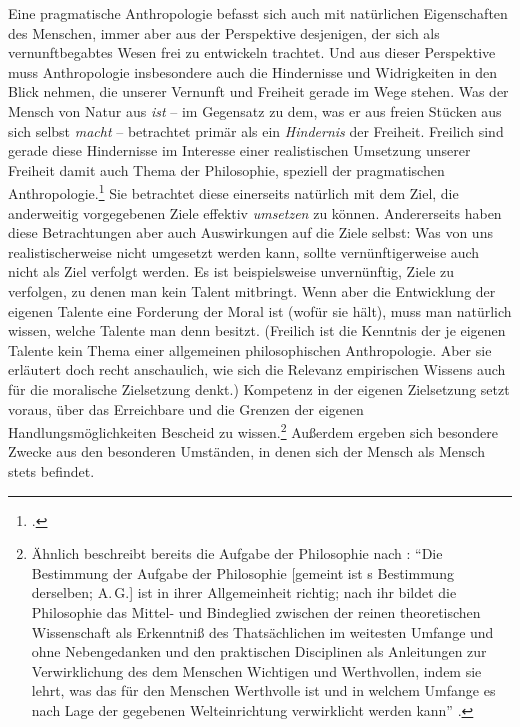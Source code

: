 Eine pragmatische Anthropologie befasst sich auch mit natürlichen Eigenschaften
des Menschen, immer aber aus der Perspektive desjenigen, der sich als
vernunftbegabtes Wesen frei zu entwickeln trachtet. Und aus dieser Perspektive
muss Anthropologie insbesondere auch die Hindernisse und
Widrigkeiten in den Blick nehmen, die unserer Vernunft und
Freiheit gerade im Wege stehen. Was der Mensch von Natur aus \emph{ist} -- im
Gegensatz zu dem, was er aus freien Stücken aus sich selbst \emph{macht} --
betrachtet  primär als ein \emph{Hindernis} der Freiheit.
Freilich sind gerade diese
Hindernisse im Interesse einer realistischen Umsetzung unserer Freiheit damit
auch Thema der Philosophie, speziell der pragmatischen
Anthropologie.\footcite[Vgl.][68]{Cohen:KantandtheHumanSciences2009} Sie
betrachtet diese einerseits natürlich mit dem Ziel, die anderweitig vorgegebenen
Ziele effektiv \emph{umsetzen} zu können. Andererseits haben diese Betrachtungen aber
auch Auswirkungen auf die Ziele selbst: Was von uns realistischerweise nicht
umgesetzt werden kann, sollte vernünftigerweise auch nicht als Ziel verfolgt
werden. Es ist beispielsweise
unvernünftig, Ziele zu verfolgen, zu denen man kein Talent mitbringt. Wenn aber
die Entwicklung der eigenen Talente eine Forderung der Moral ist (wofür
 sie hält), muss man natürlich wissen, welche Talente man
denn besitzt. (Freilich ist die Kenntnis der je eigenen Talente kein Thema einer
allgemeinen philosophischen Anthropologie. Aber sie erläutert doch recht
anschaulich, wie sich  die Relevanz empirischen Wissens
auch für die moralische Zielsetzung denkt.) Kompetenz in der eigenen Zielsetzung
setzt voraus, über das Erreichbare und die Grenzen der eigenen
Handlungsmöglichkeiten Bescheid zu wissen.\footnote{Ähnlich beschreibt bereits
die Aufgabe der Philosophie nach : \enquote{Die Bestimmung der Aufgabe der Philosophie [gemeint
ist s Bestimmung derselben; A.\,G.] ist in ihrer
Allgemeinheit richtig; nach ihr bildet die Philosophie das Mittel- und Bindeglied zwischen der reinen theoretischen
Wissenschaft als Erkenntniß des Thatsächlichen im weitesten Umfange und ohne
Nebengedanken und den praktischen Disciplinen als Anleitungen zur Verwirklichung
des dem Menschen Wichtigen und Werthvollen, indem sie lehrt, was das für den
Menschen Werthvolle ist und in welchem Umfange es nach Lage der gegebenen
Welteinrichtung verwirklicht werden kann}
\parencite[][479]{Doering:UeberKantsLehrevonBegriffundAufgabederPhilosophie1885}.}
Außerdem ergeben sich besondere Zwecke aus den besonderen Umständen, in denen
sich der Mensch als Mensch stets befindet.


